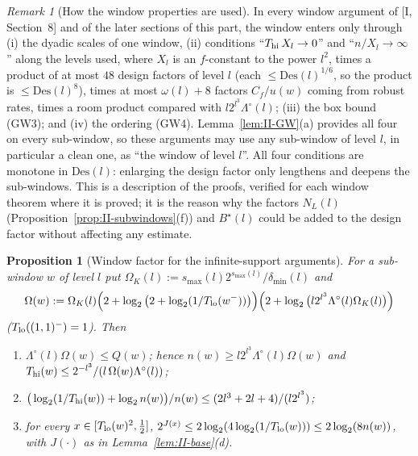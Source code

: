 \documentclass[10pt]{amsart}
\newtheorem{proposition}[theorem]{Proposition}
\theoremstyle{definition}
\theoremstyle{remark}
\newtheorem{remark}[theorem]{Remark}
\begin{document}
\begin{remark}[How the window properties are used]\label{rem:II-GWuse}
In every window argument of [I, Section~8] and of the later
sections of this part, the window enters only through (i) the dyadic
scales of one window, (ii) conditions ``$T_{\rm hi}\,X_l\to0$'' and
``$n/X_l\to\infty$'' along the levels used, where $X_l$ is an
$f$-constant to the power $l^2$, times a product of at most $48$ design
factors of level $l$ (each $\le\mathrm{Des}(l)^{1/6}$, so the product is
$\le\mathrm{Des}(l)^8$), times at most $\omega(l)+8$ factors
$C_f/u(w)$ coming from robust rates, times a room product compared with
$l2^{l^3}\Lambda^\circ(l)$; (iii) the box bound (GW3); and (iv) the
ordering (GW4).  Lemma~\ref{lem:II-GW}(a) provides all four on every
sub-window, so these arguments may use any sub-window of level $l$, in
particular a clean one, as ``the window of level $l$''.  All four
conditions are monotone in $\mathrm{Des}(l)$: enlarging the design factor
only lengthens and deepens the sub-windows.  This is a description of the
proofs, verified for each window theorem where it is proved; it is the
reason why the factors $N_L(l)$ (Proposition~\ref{prop:II-subwindows}(f))
and $B^\star(l)$ could be added to the design factor without affecting
any estimate.
\end{remark}

\begin{proposition}[Window factor for the infinite-support arguments]
\label{prop:II-RSwindow}
For a sub-window $w$ of level $l$ put
$\Omega_K(l):=s_{\max}(l)2^{s_{\max}(l)}/\delta_{\min}(l)$ and
\[
 \Omega(w):=\Omega_K(l)\Big(2+\log_2\big(2+\log_2(1/T_{\rm lo}(w^-))\big)
 \Big)\Big(2+\log_2\big(l2^{l^3}\Lambda^\circ(l)\Omega_K(l)\big)\Big)
\]
\textup{(}$T_{\rm lo}((1,1)^-)=1$\textup{)}.  Then
\begin{enumerate}
\item[(a)] $\Lambda^\circ(l)\Omega(w)\le Q(w)$; hence
$n(w)\ge l2^{l^3}\Lambda^\circ(l)\Omega(w)$ and
$T_{\rm hi}(w)\le2^{-l^3}/(l\,\Omega(w)\Lambda^\circ(l))$;
\item[(b)] $\big(\log_2(1/T_{\rm hi}(w))+\log_2n(w)\big)/n(w)\le
(2l^3+2l+4)/(l2^{l^3})$;
\item[(c)] for every $x\in[T_{\rm lo}(w)^2,\frac12]$,
$2^{J(x)}\le2\log_2(4\log_2(1/T_{\rm lo}(w)))\le2\log_2(8n(w))$, with
$J(\cdot)$ as in Lemma~\ref{lem:II-base}(d).
\end{enumerate}
\end{proposition}
\end{document}
